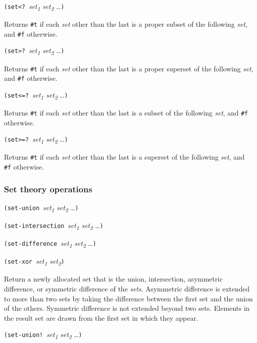 \texttt{(set\textless{}?\ }\emph{set\textsubscript{1}
set\textsubscript{2}} \ldots{}\texttt{)}

Returns \texttt{\#t} if each \emph{set} other than the last is a proper
subset of the following \emph{set}, and \texttt{\#f} otherwise.

\texttt{(set\textgreater{}?\ }\emph{set\textsubscript{1}
set\textsubscript{2}} \ldots{}\texttt{)}

Returns \texttt{\#t} if each \emph{set} other than the last is a proper
superset of the following \emph{set}, and \texttt{\#f} otherwise.

\texttt{(set\textless{}=?\ }\emph{set\textsubscript{1}
set\textsubscript{2}} \ldots{}\texttt{)}

Returns \texttt{\#t} if each \emph{set} other than the last is a subset
of the following \emph{set}, and \texttt{\#f} otherwise.

\texttt{(set\textgreater{}=?\ }\emph{set\textsubscript{1}
set\textsubscript{2}} \ldots{}\texttt{)}

Returns \texttt{\#t} if each \emph{set} other than the last is a
superset of the following \emph{set}, and \texttt{\#f} otherwise.

\hypertarget{Settheoryoperations}{\subsubsection{Set theory
operations}\label{Settheoryoperations}}

\texttt{(set-union\ }\emph{set\textsubscript{1} set\textsubscript{2}}
\ldots{}\texttt{)}

\texttt{(set-intersection\ }\emph{set\textsubscript{1}
set\textsubscript{2}} \ldots{}\texttt{)}

\texttt{(set-difference\ }\emph{set\textsubscript{1}
set\textsubscript{2}} \ldots{}\texttt{)}

\texttt{(set-xor\ }\emph{set\textsubscript{1}
set\textsubscript{2}}\texttt{)}

Return a newly allocated set that is the union, intersection, asymmetric
difference, or symmetric difference of the \emph{sets}. Asymmetric
difference is extended to more than two sets by taking the difference
between the first set and the union of the others. Symmetric difference
is not extended beyond two sets. Elements in the result set are drawn
from the first set in which they appear.

\texttt{(set-union!\ }\emph{set\textsubscript{1} set\textsubscript{2}}
\ldots{}\texttt{)}

